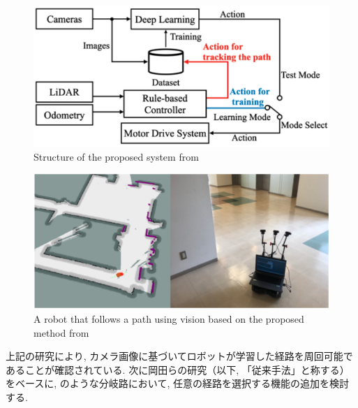 \vspace{2.5cm}

\begin{figure}[hbtp]
     \centering
     \includegraphics[keepaspectratio, scale=0.55]
          {images/okada_structure.png}
     \caption{Structure of the proposed system from \cite{okada1}}
     \label{Fig:okada_structure}
\end{figure}

\begin{figure}[hbtp]
     \centering
    \includegraphics[keepaspectratio, scale=0.5]
         {images/okada_nav.png}
    \caption{A robot that follows a path using vision based on the proposed method from \cite{okada1}}
    \label{Fig:okada_nav}
\end{figure}

\newpage

上記の研究により, カメラ画像に基づいてロボットが学習した経路を周回可能であることが確認されている. 次に岡田ら\cite{okada1}の研究（以下, 「従来手法」と称する）をベースに, のような分岐路において, 任意の経路を選択する機能の追加を検討する.

\vspace{1cm}

